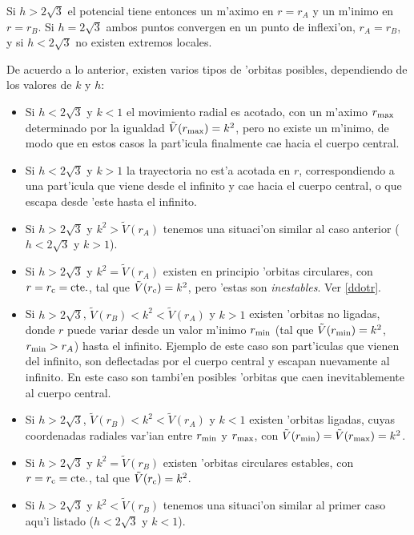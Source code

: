 Si $h>2\sqrt{3}$ el potencial tiene entonces un m'aximo en $r=r_A$ y un m'inimo en $r=r_B$. Si $h=2\sqrt{3}$ ambos puntos convergen en un punto de inflexi'on, $r_A=r_B$, y si $h<2\sqrt{3}$ no existen extremos locales.

De acuerdo a lo anterior, existen varios tipos de 'orbitas posibles, dependiendo de los valores de $k$ y $h$:

\begin{itemize}
 \item Si $h<2\sqrt{3}$ y $k<1$ el movimiento radial es acotado, con un m'aximo $r_{\rm max}$ determinado por la igualdad $\tilde{V}(r_{\rm max})=k^2$, pero no existe un m'inimo, de modo que en estos casos la part'icula finalmente cae hacia el cuerpo central.
\item Si $h<2\sqrt{3}$ y $k>1$ la trayectoria no est'a acotada en $r$, correspondiendo a una part'icula que viene desde el infinito y cae hacia el cuerpo central, o que escapa desde 'este hasta el infinito.
\item Si $h>2\sqrt{3}$ y $k^2>\tilde{V}(r_A)$ tenemos una situaci'on similar al caso anterior ($h<2\sqrt{3}$ y $k>1$).
\item Si $h>2\sqrt{3}$ y $k^2=\tilde{V}(r_A)$ existen en principio 'orbitas circulares, con $r=r_{\rm c}=\text{cte.}$, tal que $\tilde{V}(r_{\rm c})=k^2$, pero 'estas son \textit{inestables}. Ver \eqref{ddotr}.
\item Si $h>2\sqrt{3}$, $\tilde{V}(r_B)<k^2<\tilde{V}(r_A)$ y $k>1$ existen 'orbitas no ligadas, donde $r$ puede variar desde un valor m'inimo $r_{\rm min}$ (tal que $\tilde{V}(r_{\rm min})=k^2$, $r_{\rm min}>r_A$) hasta el infinito. Ejemplo de este caso son part'iculas que vienen del infinito, son deflectadas por el cuerpo central y escapan nuevamente al infinito. En este caso son tambi'en posibles 'orbitas que caen inevitablemente al cuerpo central.
\item Si $h>2\sqrt{3}$, $\tilde{V}(r_B)<k^2<\tilde{V}(r_A)$ y $k<1$ existen 'orbitas ligadas, cuyas coordenadas radiales var'ian entre $r_{\rm min}$ y $r_{\rm max}$, con $\tilde{V}(r_{\rm min})=\tilde{V}(r_{\rm max})=k^2$.
\item Si $h>2\sqrt{3}$ y $k^2=\tilde{V}(r_B)$ existen 'orbitas circulares estables, con $r=r_{\rm c}=\text{cte.}$, tal que $\tilde{V}(r_{\rm c})=k^2$.
\item Si $h>2\sqrt{3}$ y $k^2<\tilde{V}(r_B)$ tenemos una situaci'on similar al primer caso aqu'i listado ($h<2\sqrt{3}$ y $k<1$).
\end{itemize}

